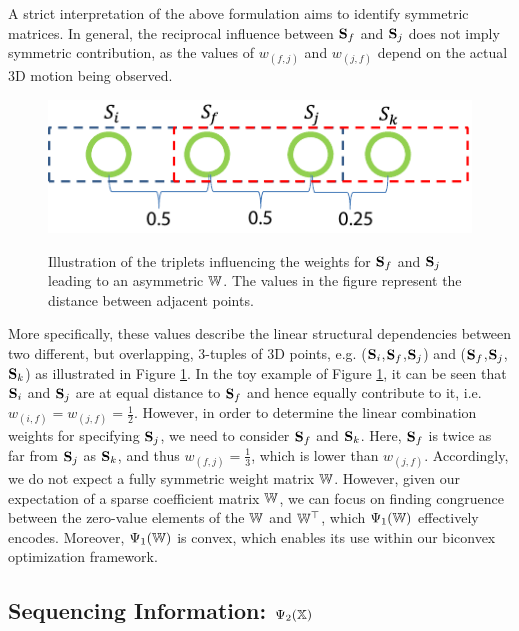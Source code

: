 A strict interpretation of the above formulation aims to identify symmetric matrices.
In general, the reciprocal influence between $\mathbf S_{f}$ and $\mathbf S_{j}$ does not imply symmetric contribution,
as the values of $w_{(f,j)}$ and  $w_{(j,f)}$ depend on the actual 3D motion being observed.
\begin{figure}
  \centering
  \includegraphics[width=0.75\columnwidth]{chapter5/resource/TripletFig.pdf}\\
  \caption[Illustration of the relationship between shape weights.]{Illustration of the triplets influencing the weights for $\mathbf S_f$ and $\mathbf S_j$ leading to an asymmetric $\mathbb W$. The values in the figure represent the distance between adjacent points.}
  \label{fig:Triplet}
\end{figure}
More specifically, these values describe the linear structural  dependencies between two different, but overlapping, 3-tuples of 3D points, e.g. ($\mathbf S_{i}$,$\mathbf S_{f}$,$\mathbf S_{j}$) and ($\mathbf S_{f}$,$\mathbf S_{j}$,$\mathbf S_{k}$) as illustrated in Figure \ref{fig:Triplet}. In the toy example of Figure \ref{fig:Triplet}, it can be seen that $\mathbf S_{i}$ and $\mathbf S_{j}$ are at equal distance to $\mathbf S_{f}$ and hence equally contribute to it, i.e. $w_{(i,f)} = w_{(j,f)}=\frac{1}{2}$. However, in order to determine the linear combination weights for specifying $\mathbf S_j$, we need to consider $\mathbf S_f$ and $\mathbf S_k$. Here, $\mathbf S_f$ is twice as far from $\mathbf S_j$ as $\mathbf S_k$, and thus $w_{(f,j)}=\frac{1}{3}$, which is lower than $w_{(j,f)}$.
Accordingly, we do not expect a fully symmetric weight matrix   $\mathbb W$. However,  given our expectation of a sparse coefficient matrix $\mathbb W$, we can focus on finding congruence between the zero-value elements of the $\mathbb W$ and $\mathbb W^\top$, which $\Psi_1(\mathbb W)$ effectively encodes.
Moreover, $\Psi_1(\mathbb W)$  is convex, which enables its use within our biconvex optimization framework.

\subsection{Sequencing Information: \texorpdfstring{$\Psi_2(\mathbb X)$}{psiallX} }

